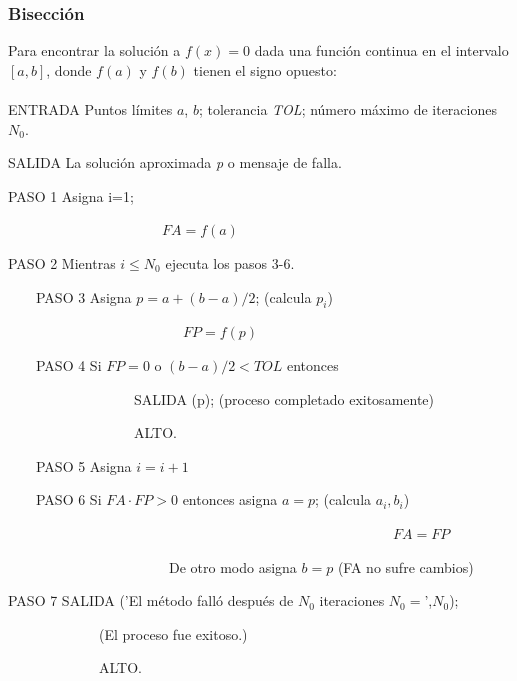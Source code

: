 \begin{tcolorbox}[colback=blue!15!]
\subsubsection*{Bisección}
Para encontrar la solución a $f(x)=0$ dada una función continua en el intervalo $[a,b]$, donde $f(a)$ y $f(b)$ tienen el signo opuesto:
\\ \\
ENTRADA Puntos límites $a$, $b$; tolerancia \textit{TOL}; número máximo de iteraciones $N_0$.

SALIDA La solución aproximada \textit{p} o mensaje de falla.

PASO 1 Asigna i=1;

\ \ \ \ \ \ \ \ \ \ \ \ \ \ \ \ \ \ \ \ \ \ $FA=f(a)$

PASO 2 Mientras $i\leq N_0$ ejecuta los pasos 3-6.

\ \ \ \  PASO 3 Asigna $p=a+(b-a)/2$; (calcula $p_i$)

\ \ \ \ \ \ \ \ \ \ \ \ \ \ \ \ \ \ \ \ \ \ \ \ \ $FP=f(p)$
    
\ \ \ \   PASO 4 Si $FP=0$ o $(b-a)/2<TOL$ entonces

\ \ \ \ \ \ \ \ \ \ \ \ \ \ \ \ \ \ SALIDA (p); (proceso completado exitosamente)

\ \ \ \ \ \ \ \ \ \ \ \ \ \ \ \ \ \ ALTO.

\ \ \ \   PASO 5 Asigna $i=i+1$
    
\ \ \ \   PASO 6 Si $FA\cdot FP>0$ entonces asigna $a=p$; (calcula $a_i,b_i$)

\ \ \ \ \ \ \ \ \ \ \ \ \ \ \ \ \ \ \ \ \ \ \ \ \ \ \ \ \ \ \ \ \ \ \ \ \ \ \ \ \ \ \ \ \ \ \ \ \ \ \ \ \ \ \ $FA=FP$

\ \ \ \ \ \ \ \ \ \ \ \ \ \ \ \ \ \ \ \ \ \ \ De otro modo asigna $b=p$ (FA no sufre cambios)

PASO 7 SALIDA ('El método falló después de $N_0$ iteraciones $N_0=$',$N_0$);

\ \ \ \ \ \ \ \ \ \ \ \ \ (El proceso fue exitoso.)

\ \ \ \ \ \ \ \ \ \ \ \ \ ALTO.


\end{tcolorbox}

